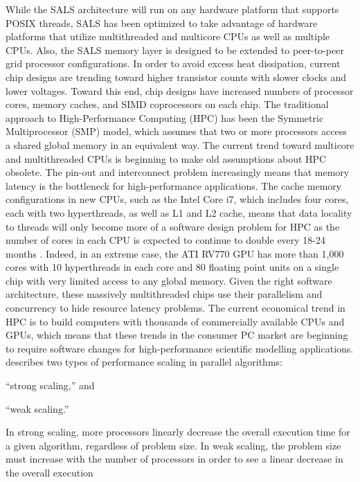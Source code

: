 While the SALS architecture will run on any hardware platform that
supports POSIX threads, SALS has been optimized to take advantage of
hardware platforms that utilize multithreaded and multicore CPUs as
well as multiple CPUs.  Also, the SALS memory layer is designed to be
extended to peer-to-peer grid processor configurations.  In order to
avoid excess heat dissipation, current chip designs are trending
toward higher transistor counts with slower clocks and lower voltages.
Toward this end, chip designs have increased numbers of processor
cores, memory caches, and SIMD coprocessors on each chip.  The
traditional approach to High-Performance Computing (HPC) has been the
Symmetric Multiprocessor (SMP) model, which assumes that two or more
processors access a shared global memory in an equivalent way.  The
current trend toward multicore and multithreaded CPUs is beginning to
make old assumptions about HPC obsolete.  The pin-out and interconnect
problem increasingly means that memory latency is the bottleneck for
high-performance applications.  The cache memory configurations in new
CPUs, such as the Intel Core i7, which includes four cores, each with
two hyperthreads, as well as L1 and L2 cache, means that data locality
to threads will only become more of a software design problem for HPC
as the number of cores in each CPU is expected to continue to double
every 18-24 months \cite[]{sodan:2010,dongarra:2007}.  Indeed, in an
extreme case, the ATI RV770 GPU has more than 1,000 cores with 10
hyperthreads in each core and 80 floating point units on a single chip
with very limited access to any global memory.  Given the right
software architecture, these massively multithreaded chips use their
parallelism and concurrency to hide resource latency problems.  The
current economical trend in HPC is to build computers with thousands
of commercially available CPUs and GPUs, which means that these trends
in the consumer PC market are beginning to require software changes
for high-performance scientific modelling applications.
\cite{sodan:2010} describes two types of performance scaling in
parallel algorithms:
\begin{packed_enumerate}
\item{``strong scaling,'' and}
\item{``weak scaling.''}
\end{packed_enumerate}
In strong scaling, more processors linearly decrease the overall
execution time for a given algorithm, regardless of problem size.  In
weak scaling, the problem size must increase with the number of
processors in order to see a linear decrease in the overall execution
